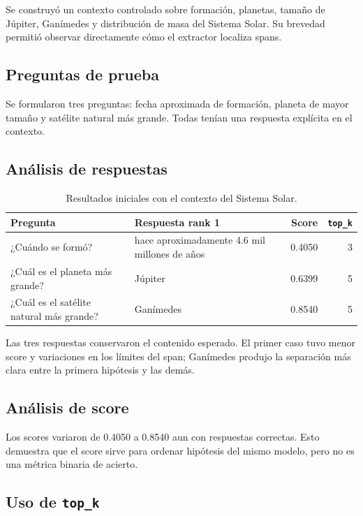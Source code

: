 \documentclass[12pt,letterpaper]{article}
\begin{document}
Se construyó un contexto controlado sobre formación, planetas, tamaño de
Júpiter, Ganímedes y distribución de masa del Sistema Solar. Su brevedad
permitió observar directamente cómo el extractor localiza spans.

\subsection{Preguntas de prueba}

Se formularon tres preguntas: fecha aproximada de formación, planeta de mayor
tamaño y satélite natural más grande. Todas tenían una respuesta explícita en
el contexto.

\subsection{Análisis de respuestas}

\begin{table}[!htbp]
\centering
\small
\caption{Resultados iniciales con el contexto del Sistema Solar.}
\begin{tabularx}{\linewidth}{@{}Ylrr@{}}
\toprule
\textbf{Pregunta} & \textbf{Respuesta rank 1} & \textbf{Score} & \textbf{\texttt{top\_k}}\\
\midrule
¿Cuándo se formó? & hace aproximadamente 4.6 mil millones de años & 0.4050 & 3\\
¿Cuál es el planeta más grande? & Júpiter & 0.6399 & 5\\
¿Cuál es el satélite natural más grande? & Ganímedes & 0.8540 & 5\\
\bottomrule
\end{tabularx}
\end{table}

Las tres respuestas conservaron el contenido esperado. El primer caso tuvo
menor score y variaciones en los límites del span; Ganímedes produjo la
separación más clara entre la primera hipótesis y las demás.

\subsection{Análisis de score}

Los scores variaron de 0.4050 a 0.8540 aun con respuestas correctas. Esto
demuestra que el score sirve para ordenar hipótesis del mismo modelo, pero no
es una métrica binaria de acierto.

\subsection{Uso de \texorpdfstring{\texttt{top\_k}}{top k}}
\end{document}

